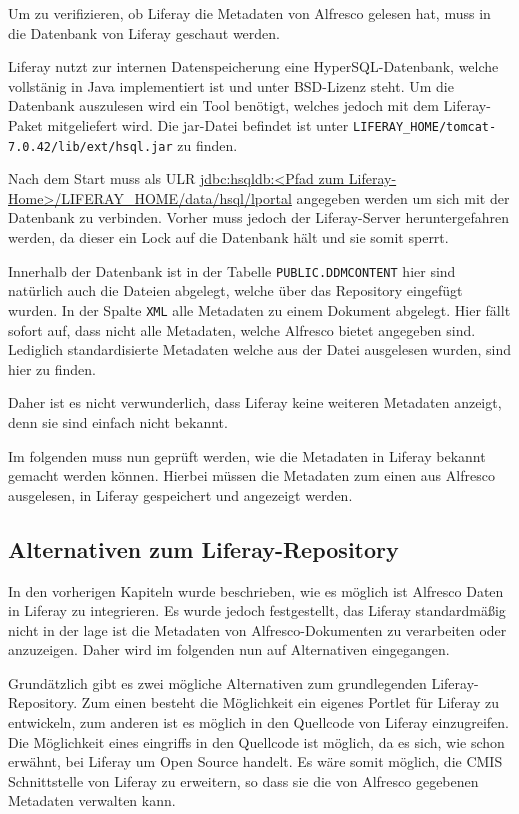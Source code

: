 Um zu verifizieren, ob Liferay die Metadaten von Alfresco gelesen hat, muss in die Datenbank von Liferay geschaut werden.

Liferay nutzt zur internen Datenspeicherung eine HyperSQL-Datenbank, welche vollst\"anig in Java implementiert ist und unter BSD-Lizenz steht. Um die Datenbank auszulesen wird ein Tool ben\"otigt, welches jedoch mit dem Liferay-Paket mitgeliefert wird. Die jar-Datei befindet ist unter \texttt{LIFERAY\_HOME/tomcat-7.0.42/lib/ext/hsql.jar} zu finden.

Nach dem Start muss als ULR \url{jdbc:hsqldb:<Pfad zum Liferay-Home>/LIFERAY\_HOME/data/hsql/lportal} angegeben werden um sich mit der Datenbank zu verbinden. Vorher muss jedoch der Liferay-Server heruntergefahren werden, da dieser ein Lock auf die Datenbank h\"alt und sie somit sperrt.

Innerhalb der Datenbank ist in der Tabelle \texttt{PUBLIC.DDMCONTENT} hier sind nat\"urlich auch die Dateien abgelegt, welche \"uber das Repository eingef\"ugt wurden. In der Spalte \texttt{XML} alle Metadaten zu einem Dokument abgelegt. Hier f\"allt sofort auf, dass nicht alle Metadaten, welche Alfresco bietet angegeben sind. Lediglich standardisierte Metadaten welche aus der Datei ausgelesen wurden, sind hier zu finden. 

Daher ist es nicht verwunderlich, dass Liferay keine weiteren Metadaten anzeigt, denn sie sind einfach nicht bekannt.

Im folgenden muss nun gepr\"uft werden, wie die Metadaten in Liferay bekannt gemacht werden k\"onnen. Hierbei m\"ussen die Metadaten zum einen aus Alfresco ausgelesen, in Liferay gespeichert und angezeigt werden.

\subsection{Alternativen zum Liferay-Repository}
In den vorherigen Kapiteln wurde beschrieben, wie es m\"oglich ist Alfresco Daten in Liferay zu integrieren. Es wurde jedoch festgestellt, das Liferay standardm\"a\ss{}ig nicht in der lage ist die Metadaten von Alfresco-Dokumenten zu verarbeiten oder anzuzeigen. Daher wird im folgenden nun auf Alternativen eingegangen.

Grund\"atzlich gibt es zwei m\"ogliche Alternativen zum grundlegenden Liferay-Repository. Zum einen besteht die M\"oglichkeit ein eigenes Portlet f\"ur Liferay zu entwickeln, zum anderen ist es m\"oglich in den Quellcode von Liferay einzugreifen. Die M\"oglichkeit eines eingriffs in den Quellcode ist m\"oglich, da es sich, wie schon erw\"ahnt, bei Liferay um Open Source handelt. Es w\"are somit m\"oglich, die CMIS Schnittstelle von Liferay zu erweitern, so dass sie die von Alfresco gegebenen Metadaten verwalten kann.

